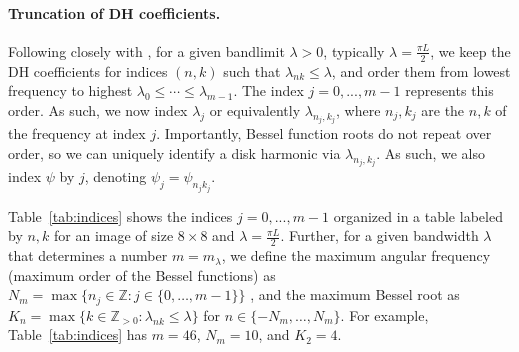 \paragraph{Truncation of DH coefficients.} Following closely with \cite{fast_dhcs_2023}, for a given bandlimit $\lambda > 0$, typically $\lambda = \frac{\pi L}{2}$, we keep the DH coefficients for indices $(n,k)$ such that $\lambda_{nk} \leq \lambda$, and order them from lowest frequency to highest $\lambda_0 \leq \cdots \leq \lambda_{m-1}$. The index $j=0, ..., m-1$ represents this order. As such, we now index $\lambda_j$ or equivalently $\lambda_{n_j,k_j}$, where $n_j, k_j$ are the $n,k$ of the frequency at index $j$. Importantly, Bessel function roots do not repeat over order, so we can uniquely identify a disk harmonic via $\lambda_{n_j,k_j}$. As such, we also index $\psi$ by $j$, denoting $\psi_j = \psi_{n_j k_j}$.

Table~\ref{tab:indices} shows the indices $j=0, ..., m-1$ organized in a table labeled by $n, k$ for an image of size $8 \times 8$ and $\lambda = \frac{\pi L}{2}$. Further, for a given bandwidth $\lambda$ that determines a number $m = m_\lambda$, we define the maximum angular frequency (maximum order of the Bessel functions) as \( N_m = \max\{n_j \in \mathbb{Z} : j \in \{0, \ldots, m-1\}\} \) , and the maximum Bessel root as \( K_n = \max\{k \in \mathbb{Z}_{>0} : \lambda_{nk} \leq \lambda\} \) for \( n \in \{-N_m, \ldots, N_m\} \). For example, Table~\ref{tab:indices} has $m=46$, $N_m = 10$, and $K_2 = 4$.
\begin{table}[t]
\centering
\scriptsize
{}
  \caption{Indices $j=0, ..., m-1$, for $m=46$ organized in a table labeled by $n, k$ for an image of size $L\times L = 8 \times 8$ and $\lambda = \frac{\pi L}{2}$. The columns represent the Bessel orders, i.e., the angular frequencies. The rows represent the Bessel root indices, i.e., the radial frequencies.}
  \label{tab:indices}
\end{table}

